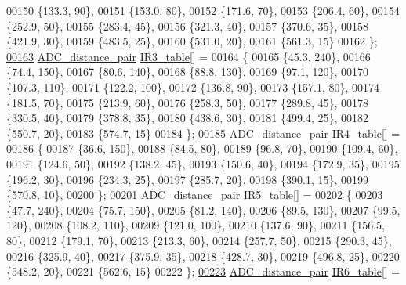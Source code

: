 \begin{DoxyCode}
00150     \{133.3, 90\},
00151     \{153.0, 80\},
00152     \{171.6, 70\},
00153     \{206.4, 60\},
00154     \{252.9, 50\},
00155     \{283.4, 45\},
00156     \{321.3, 40\},
00157     \{370.6, 35\},
00158     \{421.9, 30\},
00159     \{483.5, 25\},
00160     \{531.0, 20\},
00161     \{561.3, 15\}
00162 \};  
\hypertarget{sensor_8h_source.tex_l00163}{}\hyperlink{sensor_8h_ae2d11b07f5d070503671bd7db51a040a}{00163} \hyperlink{struct_a_d_c__distance__pair}{ADC\_distance\_pair} \hyperlink{sensor_8h_ae2d11b07f5d070503671bd7db51a040a}{IR3\_table}[] =
00164 \{
00165     \{45.3, 240\},
00166     \{74.4, 150\},
00167     \{80.6, 140\},
00168     \{88.8, 130\},
00169     \{97.1, 120\},
00170     \{107.3, 110\},
00171     \{122.2, 100\},
00172     \{136.8, 90\},
00173     \{157.1, 80\},
00174     \{181.5, 70\},
00175     \{213.9, 60\},
00176     \{258.3, 50\},
00177     \{289.8, 45\},
00178     \{330.5, 40\},
00179     \{378.8, 35\},
00180     \{438.6, 30\},
00181     \{499.4, 25\},
00182     \{550.7, 20\},
00183     \{574.7, 15\}
00184 \};  
\hypertarget{sensor_8h_source.tex_l00185}{}\hyperlink{sensor_8h_af0f2d3338f8aeee7a6dfe23213e562f6}{00185} \hyperlink{struct_a_d_c__distance__pair}{ADC\_distance\_pair} \hyperlink{sensor_8h_af0f2d3338f8aeee7a6dfe23213e562f6}{IR4\_table}[] =
00186 \{
00187     \{36.6, 150\},
00188     \{84.5, 80\},
00189     \{96.8, 70\},
00190     \{109.4, 60\},
00191     \{124.6, 50\},
00192     \{138.2, 45\},
00193     \{150.6, 40\},
00194     \{172.9, 35\},
00195     \{196.2, 30\},
00196     \{234.3, 25\},
00197     \{285.7, 20\},
00198     \{390.1, 15\},
00199     \{570.8, 10\},
00200 \};  
\hypertarget{sensor_8h_source.tex_l00201}{}\hyperlink{sensor_8h_acd33e89ce7fb300b6edfe6cdd6945a36}{00201} \hyperlink{struct_a_d_c__distance__pair}{ADC\_distance\_pair} \hyperlink{sensor_8h_acd33e89ce7fb300b6edfe6cdd6945a36}{IR5\_table}[] =
00202 \{
00203     \{47.7, 240\},
00204     \{75.7, 150\},
00205     \{81.2, 140\},
00206     \{89.5, 130\},
00207     \{99.5, 120\},
00208     \{108.2, 110\},
00209     \{121.0, 100\},
00210     \{137.6, 90\},
00211     \{156.5, 80\},
00212     \{179.1, 70\},
00213     \{213.3, 60\},
00214     \{257.7, 50\},
00215     \{290.3, 45\},
00216     \{325.9, 40\},
00217     \{375.9, 35\},
00218     \{428.7, 30\},
00219     \{496.8, 25\},
00220     \{548.2, 20\},
00221     \{562.6, 15\}
00222 \};  
\hypertarget{sensor_8h_source.tex_l00223}{}\hyperlink{sensor_8h_a919f2d74de392de03219cc9a9a662013}{00223} \hyperlink{struct_a_d_c__distance__pair}{ADC\_distance\_pair} \hyperlink{sensor_8h_a919f2d74de392de03219cc9a9a662013}{IR6\_table}[] =

\end{DoxyCode}

